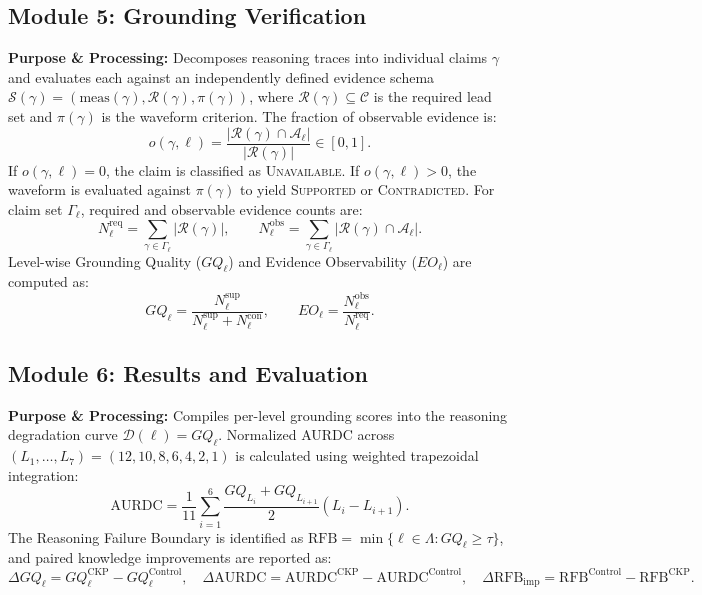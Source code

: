 \documentclass{ssnreview}
\begin{document}
\subsection{Module 5: Grounding Verification}
\textbf{Purpose \& Processing:} Decomposes reasoning traces into individual claims $\gamma$ and
evaluates each against an independently defined evidence schema
$\mathcal{S}(\gamma) = (\mathrm{meas}(\gamma), \mathcal{R}(\gamma), \pi(\gamma))$, where
$\mathcal{R}(\gamma) \subseteq \mathcal{C}$ is the required lead set and $\pi(\gamma)$ is the
waveform criterion. The fraction of observable evidence is:
\begin{equation}
  o(\gamma, \ell) = \frac{|\mathcal{R}(\gamma)\cap\mathcal{A}_\ell|}{|\mathcal{R}(\gamma)|} \in [0,1].
\end{equation}
If $o(\gamma,\ell) = 0$, the claim is classified as \textsc{Unavailable}. If $o(\gamma,\ell) > 0$,
the waveform is evaluated against $\pi(\gamma)$ to yield \textsc{Supported} or
\textsc{Contradicted}. For claim set $\Gamma_\ell$, required and observable evidence counts are:
\begin{equation}
  N_\ell^{\mathrm{req}} = \sum_{\gamma\in\Gamma_\ell} |\mathcal{R}(\gamma)|, \qquad
  N_\ell^{\mathrm{obs}} = \sum_{\gamma\in\Gamma_\ell} |\mathcal{R}(\gamma)\cap\mathcal{A}_\ell|.
\end{equation}
Level-wise Grounding Quality ($GQ_\ell$) and Evidence Observability ($EO_\ell$) are computed as:
\begin{equation}
  GQ_\ell = \frac{N_\ell^{\mathrm{sup}}}{N_\ell^{\mathrm{sup}} + N_\ell^{\mathrm{con}}}, \qquad
  EO_\ell = \frac{N_\ell^{\mathrm{obs}}}{N_\ell^{\mathrm{req}}}.
\end{equation}

\subsection{Module 6: Results and Evaluation}
\textbf{Purpose \& Processing:} Compiles per-level grounding scores into the reasoning
degradation curve $\mathcal{D}(\ell) = GQ_\ell$. Normalized AURDC across
$(L_1,\dots,L_7) = (12,10,8,6,4,2,1)$ is calculated using weighted trapezoidal integration:
\begin{equation}
  \mathrm{AURDC} = \frac{1}{11} \sum_{i=1}^6 \frac{GQ_{L_i} + GQ_{L_{i+1}}}{2}(L_i - L_{i+1}).
\end{equation}
The Reasoning Failure Boundary is identified as $\mathrm{RFB} = \min\{\ell\in\Lambda : GQ_\ell \ge \tau\}$,
and paired knowledge improvements are reported as:
\begin{equation}
  \Delta GQ_\ell = GQ_\ell^{\mathrm{CKP}} - GQ_\ell^{\mathrm{Control}}, \quad
  \Delta\mathrm{AURDC} = \mathrm{AURDC}^{\mathrm{CKP}} - \mathrm{AURDC}^{\mathrm{Control}}, \quad
  \Delta\mathrm{RFB}_{\mathrm{imp}} = \mathrm{RFB}^{\mathrm{Control}} - \mathrm{RFB}^{\mathrm{CKP}}.
\end{equation}
\end{document}

